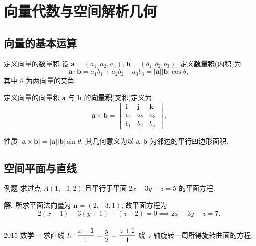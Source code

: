 \documentclass[a4paper,12pt,oneside,fontset=none]{ctexbook}
\let\olddfrac\dfrac
\renewcommand{\dfrac}[2]{
	\olddfrac{#1\vrule width 0pt height 1.15em depth 0em}{#2\vrule width 0pt height 0em depth 0.6em}
}
\newenvironment{property}[1][]{\begin{thmBox}{性质}{#1}}{\end{thmBox}}
\newcounter{definition}[chapter]
\newenvironment{definition}[1][]{\begin{defBox}{定义}{#1}}{\end{defBox}}
\newcounter{example}[chapter]
\newenvironment{example}[1][]{\begin{exBox}{例题}{#1}}{\end{exBox}}
\newenvironment{realexam}[1][]
{%
	\begin{realexamBox}{#1}}{\end{realexamBox}
}
\numberwithin{equation}{chapter}
\begin{document}
	\chapter{向量代数与空间解析几何}
	
	\section{向量的基本运算}
	
	\begin{definition}[向量的数量积]
		设 $\boldsymbol{a} = (a_1, a_2, a_3)$, $\boldsymbol{b} = (b_1, b_2, b_3)$, 定义\textbf{数量积}(内积)为
		\[
		\boldsymbol{a} \cdot \boldsymbol{b} = a_1 b_1 + a_2 b_2 + a_3 b_3 = |\boldsymbol{a}||\boldsymbol{b}|\cos\theta,
		\]
		其中 $\theta$ 为两向量的夹角.
	\end{definition}
	
	\begin{definition}[向量的向量积]
		$\boldsymbol{a}$ 与 $\boldsymbol{b}$ 的\textbf{向量积}(叉积)定义为
		\[
		\boldsymbol{a} \times \boldsymbol{b} = 
		\begin{vmatrix}
			\boldsymbol{i} & \boldsymbol{j} & \boldsymbol{k} \\
			a_1 & a_2 & a_3 \\
			b_1 & b_2 & b_3
		\end{vmatrix}.
		\]
	\end{definition}
	
	\begin{property}
		$|\boldsymbol{a} \times \boldsymbol{b}| = |\boldsymbol{a}||\boldsymbol{b}|\sin\theta$, 其几何意义为以 $\boldsymbol{a}, \boldsymbol{b}$ 为邻边的平行四边形面积.
	\end{property}
	
	\section{空间平面与直线}
	
	\begin{example}
		求过点 $A(1, -1, 2)$ 且平行于平面 $2x - 3y + z = 5$ 的平面方程.
	\end{example}
	
	\textbf{解.} 所求平面法向量为 $\boldsymbol{n} = (2, -3, 1)$, 故平面方程为
	\[
	2(x - 1) - 3(y + 1) + (z - 2) = 0 \implies 2x - 3y + z = 7.
	\]
	
	\begin{realexam}[2015 数学一]
		求直线 $L: \dfrac{x - 1}{1} = \dfrac{y}{2} = \dfrac{z + 1}{1}$ 绕 $z$ 轴旋转一周所得旋转曲面的方程.
	\end{realexam}
	
\end{document}
